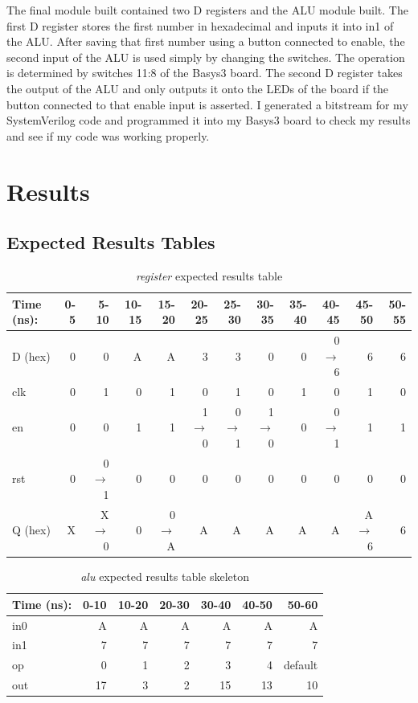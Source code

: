 \documentclass[11pt]{article}
\begin{document}
The final module built contained two D registers and the ALU module built. The first D register stores the first number in hexadecimal and inputs it into in1 of the ALU. After saving that first number using a button connected to enable, the second input of the ALU is used simply by changing the switches. The operation is determined by switches 11:8 of the Basys3 board. The second D register takes the output of the ALU and only outputs it onto the LEDs of the board if the button connected to that enable input is asserted. I generated a bitstream for my SystemVerilog code and programmed it into my Basys3 board to check my results and see if my code was working properly.





\section*{Results}

\subsection*{Expected Results Tables}

\begin{table}[ht]\centering
	\caption{\textit{register} expected results table}
	\label{ALU:tbl:register_ERT}\medskip
	\begin{tabular}{l|rrrrrrrrrrr}
		Time (ns): & 0-5 & 5-10 & 10-15 & 15-20 & 20-25 & 25-30 & 30-35 & 35-40 & 40-45 & 45-50 & 50-55 \\
		\midrule
		D (hex) & 0 & 0 	  & A & A & 3 	    & 3 	  & 0 	    & 0 & 0$\to$6 & 6 & 6 \\
		clk     & 0 & 1 	  & 0 & 1 & 0 	    & 1 	  & 0 	    & 1 & 0 	  & 1 & 0 \\
		en  	& 0 & 0 	  & 1 & 1 & 1$\to$0 & 0$\to$1 & 1$\to$0 & 0 & 0$\to$1 & 1 & 1 \\
		rst 	& 0 & 0$\to$1 & 0 & 0 & 0 		& 0 	  & 0		& 0 & 0		  & 0 & 0 \\
		\midrule
		Q (hex) & X & X$\to$0 & 0 & 0$\to$A & A & A & A & A & A & A$\to$6 & 6\\
		\bottomrule
	\end{tabular}
\end{table}
\FloatBarrier

\begin{table}[ht]\centering
	\caption{\textit{alu} expected results table skeleton}
	\label{ALU:tbl:alu_ERT}\medskip
	\begin{tabular}{l|rrrrrr}
		Time (ns): & 0-10 & 10-20 & 20-30 & 30-40 & 40-50 & 50-60 \\
		\midrule
		in0 & A & A & A & A & A & A \\
		in1 & 7 & 7 & 7 & 7 & 7 & 7 \\
		op	& 0 & 1 & 2 & 3 & 4 & default \\
		\midrule
		out & 17 & 3 & 2 & 15 & 13 & 10 \\
		\bottomrule
	\end{tabular}
\end{table}
\end{document}

